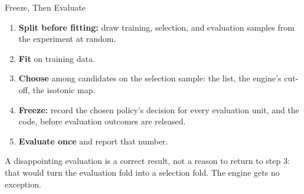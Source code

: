 \documentclass[aspectratio=169, 11pt, handout]{beamer}
\newcommand{\hatt}{\hat{\tau}}
\begin{document}
\begin{frame}{Freeze, Then Evaluate}

\begin{center}
\end{center}

\begin{enumerate}
  \item \textbf{Split before fitting:} draw training, selection, and evaluation samples from the experiment at random.
  \item \textbf{Fit} on training data.
  \item \textbf{Choose} among candidates on the selection sample: the list, the engine's cut-off, the isotonic map.
  \item \textbf{Freeze:} record the chosen policy's decision for every evaluation unit, and the code, before evaluation outcomes are released.
  \item \textbf{Evaluate once} and report that number.
\end{enumerate}

\medskip

A disappointing evaluation is a correct result, not a reason to return to step 3: that would turn the evaluation fold into a selection fold. The engine gets no exception.
\end{frame}
\end{document}
